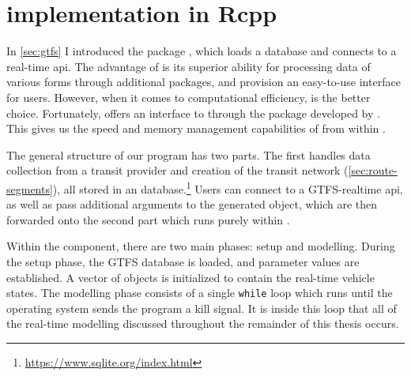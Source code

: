 

\section{\Rt{} implementation in Rcpp}
\label{sec:rt-implementation}

In \cref{sec:gtfs} I introduced the \Rstats{} package , which loads a \GTFS{} database and connects to a real-time \gls{api}. The advantage of \Rstats{} \citep{rcore} is its superior ability for processing data of various forms through additional packages, and provision an easy-to-use interface for users. However, when it comes to computational efficiency, \Cpp{} is the better choice. Fortunately, \Rstats{} offers an interface to \Cpp{} through the  package developed by \citet{Rcpp}. This gives us the speed and memory management capabilities of \Cpp{} from within \Rstats{}.

The general structure of our program has two parts. The first handles data collection from a transit provider and creation of the transit network (\cref{sec:route-segments}), all stored in an  database.\footnote{\url{https://www.sqlite.org/index.html}} Users can connect to a GTFS-realtime \gls{api}, as well as pass additional arguments to the generated  object, which are then forwarded onto the second part which runs purely within \Cpp{}.

Within the \Cpp{} component, there are two main phases: setup and modelling. During the setup phase, the GTFS database is loaded, and parameter values are established. A vector of  objects is initialized to contain the real-time vehicle states. The modelling phase consists of a single \verb+while+ loop which runs until the operating system sends the program a kill signal. It is inside this loop that all of the real-time modelling discussed throughout the remainder of this thesis occurs.


